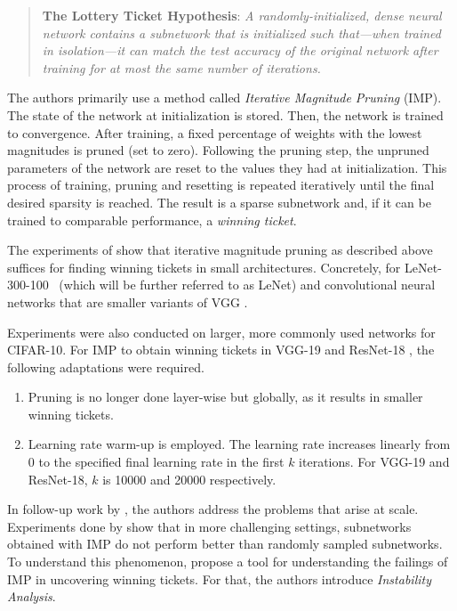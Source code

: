 \begin{quote}
\textbf{The Lottery Ticket Hypothesis}: \textit{A randomly-initialized, dense neural network contains a subnetwork that is initialized such that—when trained in isolation—it can match the test accuracy of the original network after training for at most the same number of iterations.}~\cite{LTH}
\end{quote}

The authors primarily use a method called \textit{Iterative Magnitude Pruning} ({IMP}).
The state of the network at initialization is stored.
Then, the network is trained to convergence. 
After training, a fixed percentage of weights with the lowest magnitudes is pruned (set to zero).
Following the pruning step, the unpruned parameters of the network are reset to the values they had at initialization.
This process of training, pruning and resetting is repeated iteratively until the final desired sparsity is reached.
The result is a sparse subnetwork and, if it can be trained to comparable performance,  a \textit{winning ticket}.

The experiments of \autocite{LTH} show that iterative magnitude pruning as described above suffices for finding winning tickets in small architectures.
Concretely, for LeNet-{300}-{100}~\autocite{cnn} (which will be further referred to as LeNet) and convolutional neural networks that are smaller variants of VGG \autocite{SimonyanZisserman}.

Experiments were also conducted on larger, more commonly used networks for CIFAR-10. For {IMP} to obtain winning tickets in VGG-19 \autocite{Liu19} and ResNet-18 \autocite{ResidualConnect}, the following adaptations were required. 
\begin{enumerate}
  \item Pruning is no longer done layer-wise but globally, as it results in smaller winning tickets. 
  \item Learning rate warm-up is employed. The learning rate increases linearly from 0 to the specified final learning rate in the first $k$ iterations. For VGG-19 and ResNet-18, $k$ is 10000 and 20000 respectively.
\end{enumerate}
In follow-up work by \textcite{LinearModeConnectivity}, the authors address the problems that arise at scale.
Experiments done by \textcite{Liu19, Gale19} show that in more challenging settings, subnetworks obtained with {IMP} do not perform better than randomly sampled subnetworks.
To understand this phenomenon, \textcite{LinearModeConnectivity} propose a tool for understanding the failings of {IMP} in uncovering winning tickets.
For that, the authors introduce \textit{Instability Analysis}.

